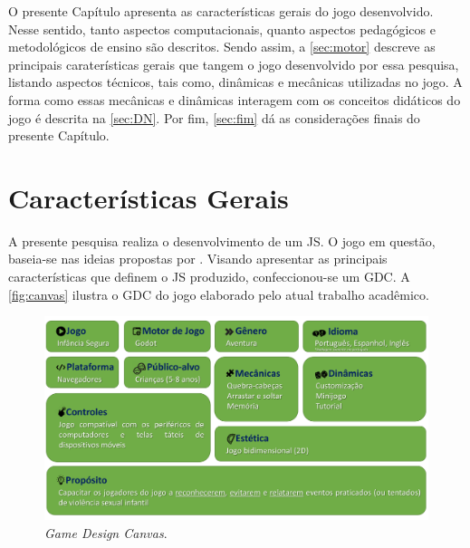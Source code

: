 O presente Capítulo apresenta as características gerais do jogo desenvolvido. Nesse sentido, tanto aspectos computacionais, quanto aspectos pedagógicos e metodológicos de ensino são descritos. Sendo assim, a \autoref{sec:motor} descreve as principais caraterísticas gerais que tangem o jogo desenvolvido por essa pesquisa, listando aspectos técnicos, tais como, dinâmicas e mecânicas utilizadas no jogo. A forma como essas mecânicas e dinâmicas interagem com os conceitos didáticos do jogo é descrita na \autoref{sec:DN}. Por fim, \autoref{sec:fim} dá as considerações finais do presente Capítulo. 


\section{Características Gerais}\label{sec:motor}

A presente pesquisa realiza o desenvolvimento de um \acf{JS}. O jogo em questão, baseia-se nas ideias propostas por . Visando apresentar as principais características que definem o \ac{JS} produzido, confeccionou-se um \ac{GDC}. A \autoref{fig:canvas} ilustra o \acl{GDC} do jogo elaborado pelo atual trabalho acadêmico. 

\begin{figure}[hbt!]
  \caption{\label{fig:canvas}\textit{Game Design Canvas}.}\vspace{-0.2cm}
  \begin{center}
    \includegraphics[width=\linewidth]{./Visuais/canvas.pdf}
    \end{center}\vspace{-0.4cm}
\end{figure}

